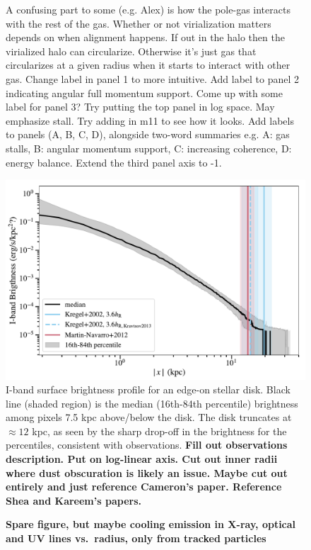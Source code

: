 \documentclass[fleqn,usenatbib]{mnras}
\begin{document}
\begin{figure}
{{A confusing part to some (e.g. Alex) is how the pole-gas interacts with the rest of the gas.
Whether or not virialization matters depends on when alignment happens. If out in the halo then the virialized halo can circularize. Otherwise it's just gas that circularizes at a given radius when it starts to interact with other gas.
Change label in panel 1 to more intuitive.
Add label to panel 2 indicating angular full momentum support.
Come up with some label for panel 3?
Try putting the top panel in log space. May emphasize stall.
Try adding in m11 to see how it looks.
Add labels to panels (A, B, C, D), alongside two-word summaries e.g. A: gas stalls, B: angular momentum support, C: increasing coherence, D: energy balance.
Extend the third panel axis to -1.
}
}
\label{f: before and after}
\end{figure}

\begin{figure}
\centering
\includegraphics[width=\columnwidth]{figures/brightness_profile.pdf}
\caption{
I-band surface brightness profile for an edge-on stellar disk.
Black line (shaded region) is the median (16th-84th percentile) brightness among pixels 7.5 kpc above/below the disk.
The disk truncates at $\approx 12$ kpc, as seen by the sharp drop-off in the brightness for the percentiles, consistent with observations.
\textbf{
Fill out observations description.
Put on log-linear axis.
Cut out inner radii where dust obscuration is likely an issue.
Maybe cut out entirely and just reference Cameron's paper.
Reference Shea and Kareem's papers.
}
}
\label{f:stellar_profile}
\end{figure}

\begin{figure}
    \centering
    \caption{
    \textbf{Spare figure, but maybe
    cooling emission in X-ray, optical and UV lines vs.\ radius, only from tracked particles
    }
    }
    \label{f: emission}
\end{figure}
\end{document}
